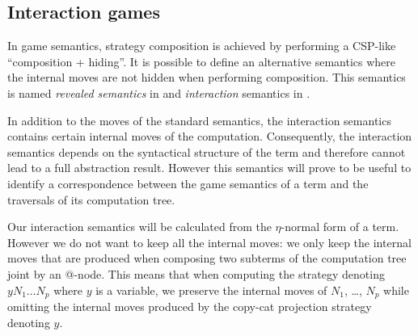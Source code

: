 \subsection{Interaction games}
\label{sec:interaction_semantics}

In game semantics, strategy composition is achieved by performing a
CSP-like ``composition + hiding''. It is possible to define an
alternative semantics where the internal moves are not hidden when
performing composition. This semantics is named \emph{revealed
semantics} in \cite{willgreenlandthesis} and \emph{interaction}
semantics in \cite{DBLP:conf/sas/DimovskiGL05}.

In addition to the moves of the standard semantics, the interaction
semantics contains certain internal moves of the computation.
Consequently, the interaction semantics depends on the syntactical
structure of the term and therefore cannot lead to a full
abstraction result. However this semantics will prove to be useful
to identify a correspondence between the game semantics of a term
and the traversals of its computation tree.

Our interaction semantics will be calculated from the $\eta$-normal
form of a term. However we do not want to keep all the internal
moves: we only keep the internal moves that are produced when
composing two subterms of the computation tree joint by an @-node.
This means that when computing the strategy denoting $y N_1 \ldots
N_p$ where $y$ is a variable, we preserve the internal moves of
$N_1$, \ldots, $N_p$ while omitting the internal moves produced by
the copy-cat projection strategy denoting $y$.


